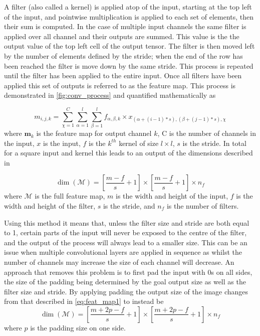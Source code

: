 \documentclass[12pt]{article}
\numberwithin{equation}{section}
\numberwithin{figure}{section}
\begin{document}
A filter (also called a kernel) is applied atop of the input, starting at the top left of the input, and pointwise multiplication is applied to each set of elements, then their sum is computed. In the case of multiple input channels the same filter is applied over all channel and their outputs are summed. This value is the the output value of the top left cell of the output tensor. The filter is then moved left by the number of elements defined by the stride; when the end of the row has been reached the filter is move down by the same stride. This process is repeated until the filter has been applied to the entire input. Once all filters have been applied this set of outputs is referred to as the feature map. This process is demonstrated in \cref{fig:conv_process} and quantified mathematically as

\begin{equation}
	m_{i,j,k} = \sum_{\chi = 1}^{C}\sum_{\alpha = 1}^{l}\sum_{\beta = 1}^{l} f_{\alpha,\beta, k} \times x_{(\alpha +(i-1)*s), (\beta + (j-1)*s),\chi}
\end{equation}
where $\bm{m}_k$ is the feature map for output channel $k$, C is the number of channels in the input, $x$ is the input, $f$ is the $k^{th}$ kernel of size $l\times l$, $s$ is the stride. In total for a square input and kernel this leads to an output of the dimensions described in 

\begin{equation}
	\label{eq:feat_map1}
	\dim(\mathscr{M}) = \left[\frac{m-f}{s} +1 \right] \times \left[\frac{m-f}{s} +1 \right] \times n_{f}
\end{equation}
where $\mathscr{M}$ is the full feature map, $m$ is the width and height of the input, $f$ is the width and height of the filter, $s$ is the stride, and $n_f$ is the number of filters.

Using this method it means that, unless the filter size and stride are both equal to 1, certain parts of the input will never be exposed to the centre of the filter, and the output of the process will always lead to a smaller size. This can be an issue when multiple convolutional layers are applied in sequence as whilst the number of channels may increase the size of each channel will decrease. An approach that removes this problem is to first pad the input with 0s on all sides, the size of the padding being determined by the goal output size as well as the filter size and stride. By applying padding the output size of the image changes from that described in \cref{eq:feat_map1} to instead be
\begin{equation}
	\label{eq:feat_map2}
	\dim(\mathscr{M}) = \left[\frac{m+2p-f}{s} +1 \right] \times \left[\frac{m+2p-f}{s} +1 \right] \times n_{f}
\end{equation}
where $p$ is the padding size on one side.
\end{document}
